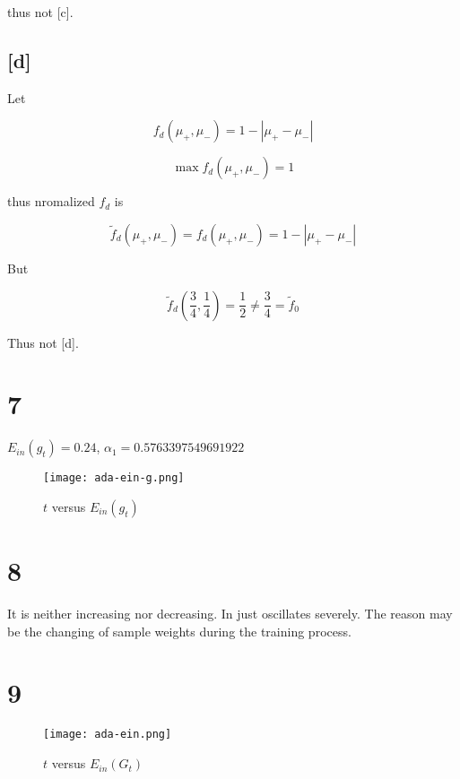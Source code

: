 \documentclass[fleqn,a4paper,12pt]{article}
\begin{document}
thus not [c].

\subsection*{[d]}

Let 

\begin{equation*}
  f_d(\mu_+, \mu_-) = 1 - |\mu_+ - \mu_-|
\end{equation*}

\begin{equation*}
  \max f_d(\mu_+, \mu_-) = 1
\end{equation*}

thus nromalized $f_d$ is 

\begin{equation*}
  \tilde{f}_d(\mu_+, \mu_-) = f_d(\mu_+, \mu_-) = 1 - |\mu_+ - \mu_-|
\end{equation*}

But 

\begin{equation*}
  \tilde{f}_d(\frac{3}{4}, \frac{1}{4}) = \frac{1}{2} \ne \frac{3}{4} = \tilde{f}_0
\end{equation*}

Thus not [d].

\section*{7}

$E_{in}(g_t) = 0.24$, $\alpha_1 = 0.5763397549691922$

\begin{figure}[h]
\centering
\texttt{[image: ada-ein-g.png]}
\caption{$t$ versus $E_{in}(g_t)$}
\label{fig:ada-ein-g}
\end{figure}

\section*{8}

It is neither increasing nor decreasing. In just oscillates severely. The reason may be the changing of sample weights during the training process.

\section*{9}

\begin{figure}[H]
\centering
\texttt{[image: ada-ein.png]}
\caption{$t$ versus $E_{in}(G_t)$}
\label{fig:ada-ein-train}
\end{figure}
\end{document}
